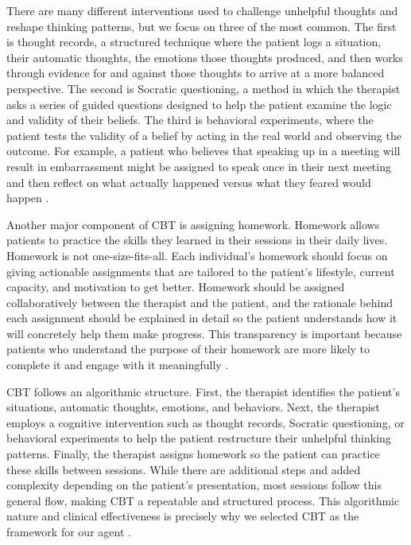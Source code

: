 \documentclass[twoside]{report}
\begin{document}
There are many different interventions used to challenge unhelpful thoughts and reshape thinking patterns, but we focus on three of the most common. The first is thought records, a structured technique where the patient logs a situation, their automatic thoughts, the emotions those thoughts produced, and then works through evidence for and against those thoughts to arrive at a more balanced perspective. The second is Socratic questioning, a method in which the therapist asks a series of guided questions designed to help the patient examine the logic and validity of their beliefs. The third is behavioral experiments, where the patient tests the validity of a belief by acting in the real world and observing the outcome. For example, a patient who believes that speaking up in a meeting will result in embarrassment might be assigned to speak once in their next meeting and then reflect on what actually happened versus what they feared would happen \cite{va2023cbt}.

Another major component of CBT is assigning homework. Homework allows patients to practice the skills they learned in their sessions in their daily lives. Homework is not one-size-fits-all. Each individual's homework should focus on giving actionable assignments that are tailored to the patient's lifestyle, current capacity, and motivation to get better. Homework should be assigned collaboratively between the therapist and the patient, and the rationale behind each assignment should be explained in detail so the patient understands how it will concretely help them make progress. This transparency is important because patients who understand the purpose of their homework are more likely to complete it and engage with it meaningfully \cite{beckinstitute2021casewriteup}.

CBT follows an algorithmic structure. First, the therapist identifies the patient's situations, automatic thoughts, emotions, and behaviors. Next, the therapist employs a cognitive intervention such as thought records, Socratic questioning, or behavioral experiments to help the patient restructure their unhelpful thinking patterns. Finally, the therapist assigns homework so the patient can practice these skills between sessions. While there are additional steps and added complexity depending on the patient's presentation, most sessions follow this general flow, making CBT a repeatable and structured process. This algorithmic nature and clinical effectiveness is precisely why we selected CBT as the framework for our agent \cite{va2023cbt}.
\FloatBarrier
\end{document}
